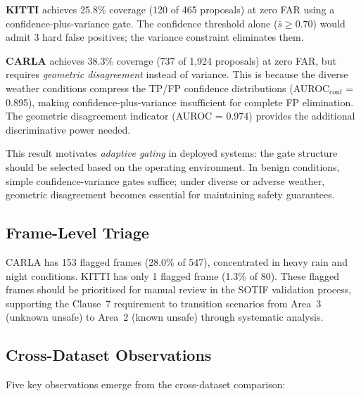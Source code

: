 \documentclass[conference]{IEEEtran}
\begin{document}
\textbf{KITTI} achieves 25.8\% coverage (120 of 465 proposals) at zero FAR using a confidence-plus-variance gate. The confidence threshold alone ($\bar{s} \geq 0.70$) would admit 3 hard false positives; the variance constraint eliminates them.

\textbf{CARLA} achieves 38.3\% coverage (737 of 1,924 proposals) at zero FAR, but requires \emph{geometric disagreement} instead of variance. This is because the diverse weather conditions compress the TP/FP confidence distributions (AUROC$_\text{conf}$ = 0.895), making confidence-plus-variance insufficient for complete FP elimination. The geometric disagreement indicator (AUROC = 0.974) provides the additional discriminative power needed.

This result motivates \emph{adaptive gating} in deployed systems: the gate structure should be selected based on the operating environment. In benign conditions, simple confidence-variance gates suffice; under diverse or adverse weather, geometric disagreement becomes essential for maintaining safety guarantees.

\subsection{Frame-Level Triage}

CARLA has 153 flagged frames (28.0\% of 547), concentrated in heavy rain and night conditions. KITTI has only 1 flagged frame (1.3\% of 80). These flagged frames should be prioritised for manual review in the SOTIF validation process, supporting the Clause~7 requirement to transition scenarios from Area~3 (unknown unsafe) to Area~2 (known unsafe) through systematic analysis.

\subsection{Cross-Dataset Observations}

Five key observations emerge from the cross-dataset comparison:
\end{document}
